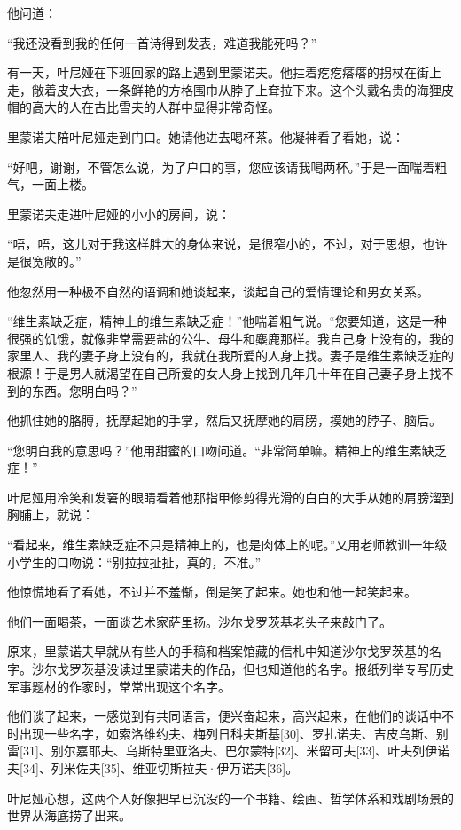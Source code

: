 他问道：

“我还没看到我的任何一首诗得到发表，难道我能死吗？”

有一天，叶尼娅在下班回家的路上遇到里蒙诺夫。他拄着疙疙瘩瘩的拐杖在街上走，敞着皮大衣，一条鲜艳的方格围巾从脖子上耷拉下来。这个头戴名贵的海狸皮帽的高大的人在古比雪夫的人群中显得非常奇怪。

里蒙诺夫陪叶尼娅走到门口。她请他进去喝杯茶。他凝神看了看她，说：

“好吧，谢谢，不管怎么说，为了户口的事，您应该请我喝两杯。”于是一面喘着粗气，一面上楼。

里蒙诺夫走进叶尼娅的小小的房间，说：

“唔，唔，这儿对于我这样胖大的身体来说，是很窄小的，不过，对于思想，也许是很宽敞的。”

他忽然用一种极不自然的语调和她谈起来，谈起自己的爱情理论和男女关系。

“维生素缺乏症，精神上的维生素缺乏症！”他喘着粗气说。“您要知道，这是一种很强的饥饿，就像非常需要盐的公牛、母牛和麋鹿那样。我自己身上没有的，我的家里人、我的妻子身上没有的，我就在我所爱的人身上找。妻子是维生素缺乏症的根源！于是男人就渴望在自己所爱的女人身上找到几年几十年在自己妻子身上找不到的东西。您明白吗？”

他抓住她的胳膊，抚摩起她的手掌，然后又抚摩她的肩膀，摸她的脖子、脑后。

“您明白我的意思吗？”他用甜蜜的口吻问道。“非常简单嘛。精神上的维生素缺乏症！”

叶尼娅用冷笑和发窘的眼睛看着他那指甲修剪得光滑的白白的大手从她的肩膀溜到胸脯上，就说：

“看起来，维生素缺乏症不只是精神上的，也是肉体上的呢。”又用老师教训一年级小学生的口吻说：“别拉拉扯扯，真的，不准。”

他惊慌地看了看她，不过并不羞惭，倒是笑了起来。她也和他一起笑起来。

他们一面喝茶，一面谈艺术家萨里扬。沙尔戈罗茨基老头子来敲门了。

原来，里蒙诺夫早就从有些人的手稿和档案馆藏的信札中知道沙尔戈罗茨基的名字。沙尔戈罗茨基没读过里蒙诺夫的作品，但也知道他的名字。报纸列举专写历史军事题材的作家时，常常出现这个名字。

他们谈了起来，一感觉到有共同语言，便兴奋起来，高兴起来，在他们的谈话中不时出现一些名字，如索洛维约夫、梅列日科夫斯基[30]、罗扎诺夫、吉皮乌斯、别雷[31]、别尔嘉耶夫、乌斯特里亚洛夫、巴尔蒙特[32]、米留可夫[33]、叶夫列伊诺夫[34]、列米佐夫[35]、维亚切斯拉夫·伊万诺夫[36]。

叶尼娅心想，这两个人好像把早已沉没的一个书籍、绘画、哲学体系和戏剧场景的世界从海底捞了出来。

